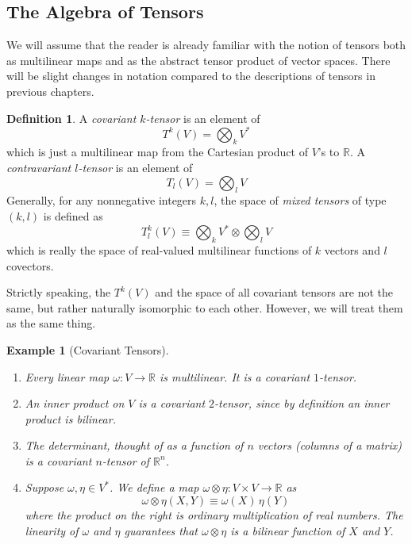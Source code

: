 \documentclass{article}
\newtheorem{example}{Example}[section]
\theoremstyle{remark}
\theoremstyle{definition}
\newtheorem{definition}{Definition}[section]
\begin{document}
  \subsection{The Algebra of Tensors}

    We will assume that the reader is already familiar with the notion of tensors both as multilinear maps and as the abstract tensor product of vector spaces. There will be slight changes in notation compared to the descriptions of tensors in previous chapters. 

    \begin{definition}
    A \textit{covariant $k$-tensor} is an element of 
    \[T^k (V) = \bigotimes_k V^*\]
    which is just a multilinear map from the Cartesian product of $V$'s to $\mathbb{R}$. A \textit{contravariant $l$-tensor} is an element of 
    \[T_l (V) = \bigotimes_l V\]
    Generally, for any nonnegative integers $k, l$, the space of \textit{mixed tensors} of type $(k, l)$ is defined as 
    \[T^k_l (V) \equiv \bigotimes_k V^* \otimes \bigotimes_l V\]
    which is really the space of real-valued multilinear functions of $k$ vectors and $l$ covectors. 
    \end{definition}

    Strictly speaking, the $T^k (V)$ and the space of all covariant tensors are not the same, but rather naturally isomorphic to each other. However, we will treat them as the same thing. 

    \begin{example}[Covariant Tensors]
    \begin{enumerate}
        \item Every linear map $\omega: V \longrightarrow \mathbb{R}$ is multilinear. It is a covariant $1$-tensor. 
        \item An inner product on $V$ is a covariant $2$-tensor, since by definition an inner product is bilinear.  
        \item The determinant, thought of as a function of $n$ vectors (columns of a matrix) is a covariant $n$-tensor of $\mathbb{R}^n$. 
        \item Suppose $\omega, \eta \in V^*$. We define a map $\omega \otimes \eta: V \times V \longrightarrow \mathbb{R}$ as
        \[\omega \otimes \eta (X, Y) \equiv \omega (X) \, \eta(Y)\]
        where the product on the right is ordinary multiplication of real numbers. The linearity of $\omega$ and $\eta$ guarantees that $\omega \otimes \eta$ is a bilinear function of $X$ and $Y$. 
    \end{enumerate}
    \end{example}
\end{document}
